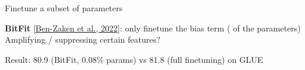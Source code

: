 \documentclass[usenames,dvipsnames,notes,11pt,aspectratio=169,hyperref={colorlinks=true, linkcolor=blue}]{beamer}
\begin{document}
\begin{frame}
    {Finetune a subset of parameters}

    \textbf{BitFit} \href{https://arxiv.org/pdf/2106.10199.pdf}{[Ben-Zaken et al., 2022]}: only finetune the bias term ( of the parameters) \\[1em]

    Amplifying / suppressing certain features?


    \medskip
    Result: 80.9 (BitFit, 0.08\% params) vs 81.8 (full finetuning) on GLUE
\end{frame}
\end{document}
